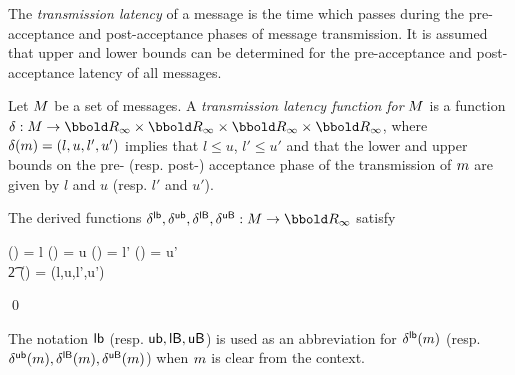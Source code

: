 The \emph{transmission latency} of a message is the time which passes
during the pre-acceptance and post-acceptance phases of message
transmission.  It is assumed that upper and lower bounds can be
determined for the pre-acceptance and post-acceptance latency of all
messages.
 
\begin{definition}\label{def:bctransmissionlatency}
Let ${M}$ be a set of messages.  A
\emph{transmission latency function for} ${M}$ is a function $\latency
: \M \fun \TimeInf \cross \TimeInf \cross \TimeInf \cross \TimeInf$,
where $\delta({m}) = (l,u,l',u')$ implies that $l \leq u$, $l' \leq
u'$ and that the lower and upper bounds on the pre- (resp. post-)
acceptance phase of the transmission of ${m}$ are given by $l$ and $u$
(resp. $l'$ and $u'$).

The derived functions $\dlb,\dub,\dlB,\duB : \M \fun \TimeInf$ satisfy
\begin{zed}
\forall \mm \in \M \such \dlb(\mm) = l \land \dub(\mm) = u \land 
 \dlB(\mm) = l' \land \duB(\mm) = u' \\
\t2 \iff \latency(\mm) = (l,u,l',u')
\end{zed} 
\qed
\end{definition}

\begin{notation}
The notation ${{\sf lb}}$ (resp. ${{\sf ub}}, {{\sf lB}}, {{\sf uB}}$) is used as an abbreviation
for ${\delta^{{\sf lb}}}({m})$ (resp. ${\delta^{{\sf ub}}}({m}), {\delta^{{\sf lB}}}({m}),
{\delta^{{\sf uB}}}({m})$) when ${m}$ is clear from the context.
\end{notation}

